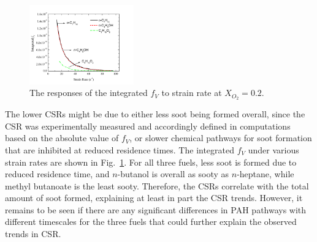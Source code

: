 \documentclass[review,3p,times]{elsarticleUS}
\begin{document}
\begin{figure}[ht]
  \centering
  \scriptsize
  \vspace{0.1in}
  \includegraphics[trim=4mm 8mm 30mm 20mm, clip=true, width=0.4\textwidth]{SV-SR.png}
  \normalsize
  \vspace{-0.1in}
  \caption{The responses of the integrated $f_V$ to strain rate at $X_{O_2}=0.2$.}
  \label{fig:fv}
\end{figure}

The lower CSRs might be due to either less soot being formed overall, since the CSR was experimentally measured and accordingly defined in computations based on the absolute value of $f_V$, or slower chemical pathways for soot formation that are inhibited at reduced residence times. The integrated $f_V$ under various strain rates are shown in Fig.~\ref{fig:fv}. For all three fuels, less soot is formed due to reduced residence time, and $n$-butanol is overall as sooty as $n$-heptane, while methyl butanoate is the least sooty. Therefore, the CSRs correlate with the total amount of soot formed, explaining at least in part the CSR trends. However, it remains to be seen if there are any significant differences in PAH pathways with different timescales for the three fuels that could further explain the observed trends in CSR.
\end{document}
